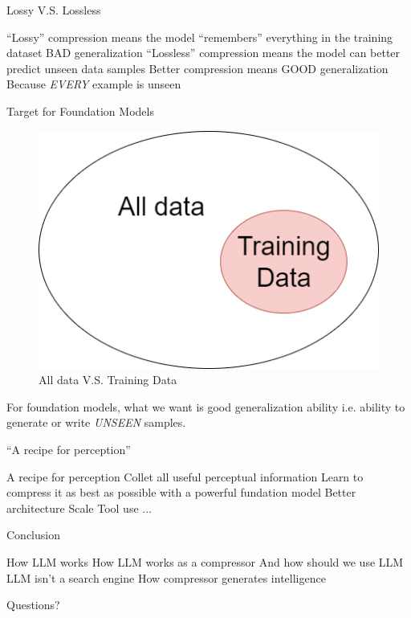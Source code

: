 \documentclass[scheme=plain]{ctexbeamer}
\begin{document}
\begin{frame}{Lossy V.S. Lossless}
  \begin{outline}
    \1 ``Lossy'' compression means the model ``remembers'' everything in the training dataset
      \2 BAD generalization
    \1 ``Lossless'' compression means the model can better predict unseen data samples
      \2 Better compression means GOOD generalization
        \3 Because \emph{EVERY} example is unseen
  \end{outline}
\end{frame}

\begin{frame}{Target for Foundation Models}
  \begin{figure}
    \includegraphics[width=.6\linewidth]{target_for_foundation_models.drawio.png}
    \caption{All data V.S. Training Data}
  \end{figure}
  \begin{outline}
    \1 For foundation models, what we want is good generalization ability
      \2 i.e. ability to generate or write \emph{UNSEEN} samples.
  \end{outline}
\end{frame}

\begin{frame}{``A recipe for perception''}
  \begin{outline}
    \0 A recipe for perception
      \1 Collet all useful perceptual information
      \1 Learn to compress it as best as possible with a powerful fundation model
        \2 Better architecture
        \2 Scale
        \2 Tool use
        \2 ...
  \end{outline}
\end{frame}


\begin{frame}{Conclusion}
  \begin{outline}
    \1 How LLM works
    \1 How LLM works as a compressor
      \2 And how should we use LLM
      \2 LLM isn't a search engine
    \1 How compressor generates intelligence
  \end{outline}
\end{frame}

\begin{frame}[standout]
  Questions?
\end{frame}
\end{document}
